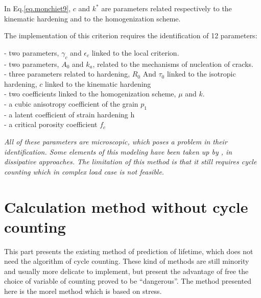 In Eq.\eqref{eq.monchiet9}, $c$ and $k^{\ast}$ are parameters related respectively to the kinematic hardening and to the homogenization scheme.

The implementation of this criterion requires the identification of 12 parameters:
\begin{flushleft}
	\qquad - \qquad two parameters, $\gamma_c$ and $\epsilon_c$ linked to the local criterion.\\
	\qquad - \qquad two parameters, $A_0$ and $k_a$, related to the mechanisms of nucleation of cracks.\\
	\qquad - \qquad three parameters related to hardening, $R_0$ And $\tau_0$ linked to the isotropic hardening, $c$ linked to  the kinematic hardening\\
	\qquad - \qquad two coefficients linked to the homogenization scheme, $\mu$ and $k$.\\
	\qquad - \qquad a cubic anisotropy coefficient of the grain $p_1$\\
	\qquad - \qquad a latent coefficient of strain hardening h\\
	\qquad - \qquad a critical porosity coefficient $f_c$\\
\end{flushleft}

\textit{All of these parameters are microscopic, which poses a problem in their identification. Some elements of this modeling have been taken up by \cite{charkaluk2009revisiting}, \cite{charkaluk2007approche} in dissipative approaches. The limitation of this method is that it still requires cycle counting which in complex load case is not feasible.}

\section{Calculation method without cycle counting}
This part presents the existing method of prediction of lifetime, which does not need the algorithm of cycle counting. These kind of methods are still minority and usually more delicate to implement, but present the advantage of free the choice of variable of counting proved to be ``dangerous''. The method presented here is the morel method which is based on stress.


